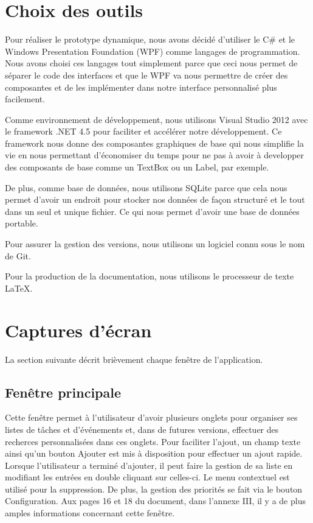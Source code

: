\documentclass[letterpaper, oneside, 12pt, these, creativecommons]{thETS}
\begin{document}
\section{Choix des outils}

Pour réaliser le prototype dynamique, nous avons décidé d'utiliser le C\# et le Windows Presentation Foundation (WPF) comme langages de programmation. Nous avons choisi ces langages tout simplement parce que ceci nous permet de séparer le code des interfaces et que le WPF va nous permettre de créer des composantes et de les implémenter dans notre interface personnalisé plus facilement. 

Comme environnement de développement, nous utilisons Visual Studio 2012 avec le framework .NET 4.5 pour faciliter et accélérer notre développement. Ce framework nous donne des composantes graphiques de base qui nous simplifie la vie en nous permettant d'économiser du temps pour ne pas à avoir à developper des composants de base comme un TextBox ou un Label, par exemple.

De plus, comme base de données, nous utilisons SQLite parce que cela nous permet d'avoir un endroit pour stocker nos données de façon structuré et le tout dans un seul et unique fichier. Ce qui nous permet d'avoir une base de données portable.

Pour assurer la gestion des versions, nous utilisons un logiciel connu sous le nom de Git.

Pour la production de la documentation, nous utilisons le processeur de texte \LaTeX.

\newpage

\section{Captures d'écran}

La section suivante décrit brièvement chaque fenêtre de l'application.

\subsection{Fenêtre principale}

Cette fenêtre permet à l'utilisateur d'avoir plusieurs onglets pour organiser ses listes de tâches et d'événements et, dans de futures versions, effectuer des recherces personnalisées dans ces onglets. Pour faciliter l'ajout, un champ texte ainsi qu'un bouton Ajouter est mis à disposition pour effectuer un ajout rapide. Lorsque l'utilisateur a terminé d'ajouter, il peut faire la gestion de sa liste en modifiant les entrées en double cliquant sur celles-ci. Le menu contextuel est utilisé pour la suppression. De plus, la gestion des priorités se fait via le bouton Configuration. Aux pages 16 et 18 du document, dans l'annexe III, il y a de plus amples informations concernant cette fenêtre.
\end{document}
